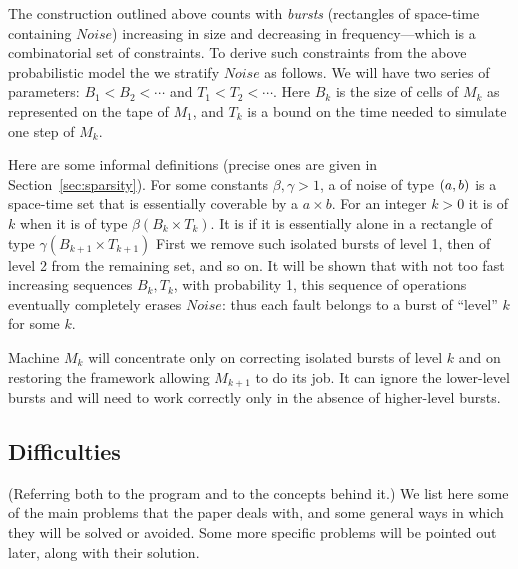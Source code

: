\documentclass[11pt]{memoir}
\theoremstyle{definition} %
\def\B{B}
\newcommand{\Noise}{\mathit{Noise}}
\newcommand{\Tu}{T}
\begin{document}
The construction outlined above counts with \emph{bursts} (rectangles of space-time
containing  \( \Noise \)) increasing in size and decreasing
in frequency---which is a combinatorial set of constraints.
To derive such constraints from the above probabilistic model
the  we stratify \( \Noise \) as follows.
We will have two series of parameters:  \( \B_{1}<\B_{2}<\dotsm \) and
\( \Tu_{1}<\Tu_{2}<\dotsm \).
Here \( \B_{k} \) is the size of cells of \( M_{k} \) as represented on the tape of \( M_{1} \),
and \( \Tu_{k} \) is a bound on the time needed to simulate one step of  \( M_{k} \).

Here are some informal definitions (precise ones are given in 
Section~\ref{sec:sparsity}).
For some constants \( \beta,\gamma>1 \),
a  of noise of type \( (a,b) \)
is a space-time set that is essentially coverable by a  \( a\times b \).
For an integer \( k>0 \) it is of  \( k \) when it is of type \( \beta(\B_{k}\times\Tu_{k}) \).
It is  if it is 
essentially alone in a rectangle of type \( \gamma(\B_{k+1}\times\Tu_{k+1}) \) 
First we remove such isolated bursts of level 1, then of level 2
from the remaining set, and so on.
It will be shown that with not too fast increasing sequences \( \B_{k},\Tu_{k} \), with probability 1,
this sequence of operations eventually completely erases \( \Noise \): thus each fault belongs to
a burst of ``level'' \( k \) for some \( k \).

Machine \( M_{k} \) will concentrate only on correcting isolated bursts of level \( k \) and on restoring
the framework allowing \( M_{k+1} \) to do its job.
It can ignore the lower-level bursts and will need to work correctly
only in the absence of higher-level bursts.


\subsection{Difficulties}\label{sec:novelties}

(Referring both to the program and to the concepts behind it.)
We list here some of the main problems that the paper deals with, 
and some general ways in which they will be solved or avoided.
Some more specific problems will be pointed out later, along with their solution.
\end{document}
